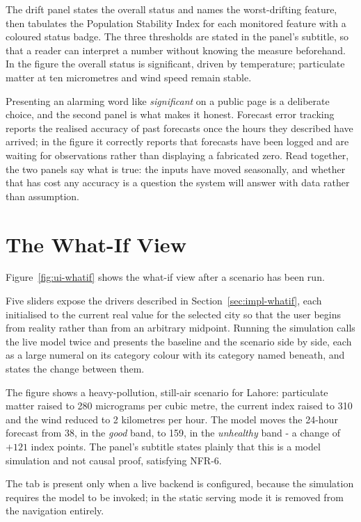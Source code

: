 The drift panel states the overall status and names the worst-drifting feature,
then tabulates the Population Stability Index for each monitored feature with a
coloured status badge. The three thresholds are stated in the panel's subtitle, so
that a reader can interpret a number without knowing the measure beforehand. In
the figure the overall status is significant, driven by temperature; particulate
matter at ten micrometres and wind speed remain stable.

Presenting an alarming word like \emph{significant} on a public page is a
deliberate choice, and the second panel is what makes it honest. Forecast error
tracking reports the realised accuracy of past forecasts once the hours they
described have arrived; in the figure it correctly reports that forecasts have
been logged and are waiting for observations rather than displaying a fabricated
zero. Read together, the two panels say what is true: the inputs have moved
seasonally, and whether that has cost any accuracy is a question the system will
answer with data rather than assumption.

\section{The What-If View}
Figure~\ref{fig:ui-whatif} shows the what-if view after a scenario has been run.


Five sliders expose the drivers described in Section~\ref{sec:impl-whatif}, each
initialised to the current real value for the selected city so that the user
begins from reality rather than from an arbitrary midpoint. Running the simulation
calls the live model twice and presents the baseline and the scenario side by
side, each as a large numeral on its category colour with its category named
beneath, and states the change between them.

The figure shows a heavy-pollution, still-air scenario for Lahore: particulate
matter raised to 280 micrograms per cubic metre, the current index raised to 310
and the wind reduced to 2 kilometres per hour. The model moves the 24-hour
forecast from 38, in the \emph{good} band, to 159, in the \emph{unhealthy} band -
a change of $+121$ index points. The panel's subtitle states plainly that this is
a model simulation and not causal proof, satisfying NFR-6.

The tab is present only when a live backend is configured, because the simulation
requires the model to be invoked; in the static serving mode it is removed from
the navigation entirely.

